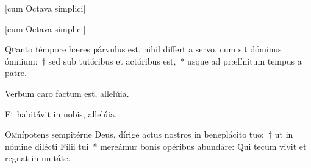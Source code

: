 \documentclass[vesperale_romanum.tex]{subfiles}
\begin{document}
\label{deus_tuorum_militum_nat} \hymnus


\admagnificat


\newpage
{} \label{dec_27}


[cum Octava simplici]

\hymnus


 \label{dec_28}


[cum Octava simplici]

\hymnus






\label{cap_quanto_tempore}


\lettrine[depth=1]{Q}{u}anto témpore hæres párvulus est, nihil differt a servo, cum sit dóminus ómnium:~† sed sub tutóribus et actóribus est,~* usque ad præfínitum tempus a patre.



\vv Verbum caro factum est, allelúia. 

\rr Et habitávit in nobis, allelúia.

\admagnificat
{}

\oratio %

\label{oratio_dom_infra_oct_nat}

\lettrine{O}{m}nípotens sempitérne Deus, dírige actus nostros in beneplácito tuo:~† ut in nómine dilécti Fílii tui~* mereámur bonis opéribus abundáre:
Qui tecum vivit et regnat in unitáte.
\end{document}

